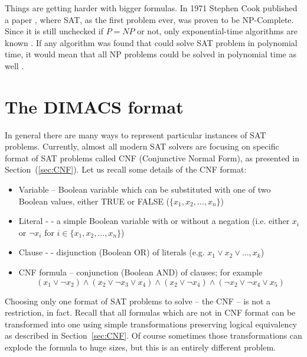 \documentclass[12pt,english,pdflatex]{aghdpl}
\begin{document}
Things are getting harder with bigger formulas. In 1971 Stephen Cook
published a paper \cite{Cook:1971}, where SAT, as the  first problem ever,
was proven to be NP-Complete.
Since it is still unchecked if $P=\mathit{NP}$ or not, only exponential-time
algorithms are known \cite{Biere:2009}. If any algorithm was found that
could solve SAT problem in polynomial time, it would mean that all
NP problems could be solved in polynomial time as well \cite{vanLeeuwen:1991}.

\section{The DIMACS format}
\label{sec:dimacs}

In general there are many ways to represent particular instances of SAT problems. Currently,
almost all modern SAT solvers are focusing on specific format of SAT
problems called CNF (Conjunctive Normal Form), as presented in Section~(\ref{sec:CNF}). Let us recall some details of the 
CNF format:
\begin{itemize}
\item Variable -- Boolean variable which can be substituted with one of two
Boolean values, either TRUE or FALSE ($\{x_{1}, x_{2},\ldots, x_{n} \}$)
\item Literal - - a simple Boolean variable with or without a negation (i.e. either $x_{i}$ or $\neg x_{i}$ for $i \in \{x_{1}, x_{2},\ldots, x_{n} \}$)
\item Clause - - disjunction (Boolean OR) of literals (e.g. $x_{1} \vee x_{2} \vee \ldots, x_{k} $)
\item CNF formula -- conjunction (Boolean AND) of clauses; for example
\begin{equation}
\label{equ:ex1}
(x_{1}\vee \neg x_{2})\wedge (x_{2}\vee \neg x_{3}\vee x_{4})\wedge (x_{2}\vee \neg x_{4})\wedge (\neg x_{2}\vee \neg x_{4} \vee x_{5})
\end{equation}
\end{itemize}

Choosing only one format of SAT problems to solve -- the CNF -- is not a restriction, in fact. Recall that all formulas which are not in CNF format can be
transformed into one using simple transformations preserving logical equivalency as described in Section~\ref{sec:CNF}. Of course sometimes
those transformations can explode the formula to huge sizes, but this
is an entirely different problem. 
\end{document}
